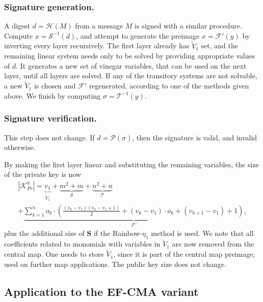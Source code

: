 \documentclass[draft, 12pt, a4paper, oneside]{memoir}
\theoremstyle{definition}
\theoremstyle{remark}
\begin{document}
\subsubsection{Signature generation.}

A digest $d = \mathcal{H}(M)$ from a message $M$ is signed with a similar
procedure. Compute $x = \mathcal{S}^{-1}(d)$, and attempt to generate the preimage
$x = \mathcal{F}'(y)$ by inverting every layer recursively. The first
layer already has $\widetilde{V}_{1}$ set, and the remaining linear system
needs only to be solved by providing appropriate values of $d$. It
generates a new set of vinegar variables, that can be used on the next layer,
until all layers are solved. If any of the transitory systems are not solvable,
a new $\widetilde{V}_{1}$ is chosen and $\mathcal{F}'$ regenerated, according
to one of the methods given above. We finish by computing
$\sigma = \mathcal{T}^{-1}(y)$.

\subsubsection{Signature verification.}

This step does not change. If $d = \mathcal{P}(\sigma)$, then the signature is
valid, and invalid otherwise.

By making the first layer linear and substituting the remaining variables, the
size of the private key is now
\begin{multline}
  |\mathcal{K}_{Pr}^{\eta}| = \underbrace{v_{1}}_{\widetilde{V}_{1}}
    + \underbrace{m^{2} + m}_{\mathcal{S}}
    + \underbrace{n^{2} + n}_{\mathcal{T}} \\
    + \underbrace{\sum_{k = 1}^{u} o_{k} \cdot \left( \frac{(v_{k} - v_{1})(v_{k} - v_{1} + 1)}{2}
      + (v_{k} - v_{1}) \cdot o_{k} + (v_{k + 1} - v_{1}) + 1 \right)}_{\mathcal{F}'},
\end{multline}
plus the additional size of $\mathbf{S}$ if the Rainbow-$\eta_{1}$ method is
used. We note that all coefficients related to monomials with variables in $\widetilde{V}_{1}$ are now removed from the central map. One needs to store $\widetilde{V}_{1}$, since it is part of the central
map preimage, used on further map applications. The public key size does not
change.

\subsection{Application to the EF-CMA variant}\label{subsec:efcma}
\end{document}
